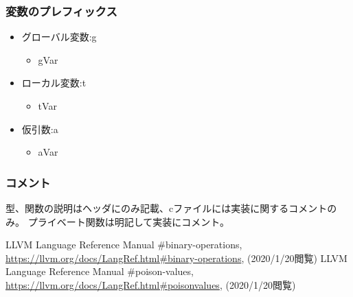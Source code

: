 \documentclass[a4paper,12pt]{jsarticle}
\begin{document}
\subsubsection*{変数のプレフィックス}
\begin{itemize}
  \item グローバル変数:g
        \begin{itemize}
          \item gVar
        \end{itemize}
  \item ローカル変数:t
        \begin{itemize}
          \item tVar
        \end{itemize}
  \item 仮引数:a
        \begin{itemize}
          \item aVar
        \end{itemize}
\end{itemize}

\subsubsection*{コメント}
型、関数の説明はヘッダにのみ記載、cファイルには実装に関するコメントのみ。
プライベート関数は明記して実装にコメント。





\begin{thebibliography}{9}
   LLVM Language Reference Manual \#binary-operations,  \url{https://llvm.org/docs/LangRef.html#binary-operations}, (2020/1/20閲覧)
   LLVM Language Reference Manual \#poison-values,  \url{https://llvm.org/docs/LangRef.html#poisonvalues}, (2020/1/20閲覧)
\end{thebibliography}
\end{document}

